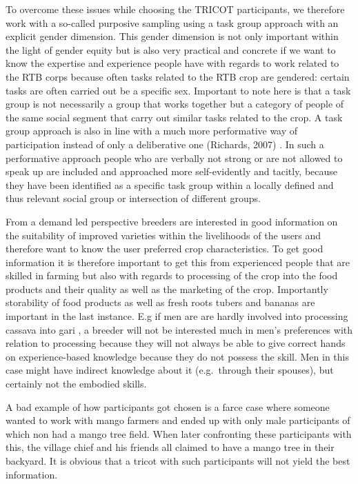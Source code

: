 \documentclass[
]{book}
\begin{document}
To overcome these issues while choosing the TRICOT participants, we therefore work with a so-called purposive sampling using a task group approach with an explicit gender dimension. This gender dimension is not only important within the light of gender equity but is also very practical and concrete if we want to know the expertise and experience people have with regards to work related to the RTB corps because often tasks related to the RTB crop are gendered: certain tasks are often carried out be a specific sex. Important to note here is that a task group is not necessarily a group that works together but a category of people of the same social segment that carry out similar tasks related to the crop.
A task group approach is also in line with a much more performative way of participation instead of only a deliberative one (Richards, 2007) . In such a performative approach people who are verbally not strong or are not allowed to speak up are included and approached more self-evidently and tacitly, because they have been identified as a specific task group within a locally defined and thus relevant social group or intersection of different groups.

From a demand led perspective breeders are interested in good information on the suitability of improved varieties within the livelihoods of the users and therefore want to know the user preferred crop characteristics. To get good information it is therefore important to get this from experienced people that are skilled in farming but also with regards to processing of the crop into the food products and their quality as well as the marketing of the crop. Importantly storability of food products as well as fresh roots tubers and bananas are important in the last instance. E.g if men are are hardly involved into processing cassava into gari , a breeder will not be interested much in men's preferences with relation to processing because they will not always be able to give correct hands on experience-based knowledge because they do not possess the skill. Men in this case might have indirect knowledge about it (e.g.~through their spouses), but certainly not the embodied skills.

A bad example of how participants got chosen is a farce case where someone wanted to work with mango farmers and ended up with only male participants of which non had a mango tree field. When later confronting these participants with this, the village chief and his friends all claimed to have a mango tree in their backyard. It is obvious that a tricot with such participants will not yield the best information.
\end{document}
